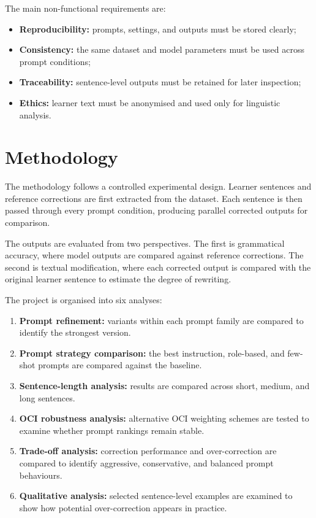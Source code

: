 The main non-functional requirements are:

\begin{itemize}
    \item \textbf{Reproducibility:} prompts, settings, and outputs must be stored clearly;
    \item \textbf{Consistency:} the same dataset and model parameters must be used across prompt conditions;
    \item \textbf{Traceability:} sentence-level outputs must be retained for later inspection;
    \item \textbf{Ethics:} learner text must be anonymised and used only for linguistic analysis.
\end{itemize}

\section{Methodology}

The methodology follows a controlled experimental design. Learner sentences and reference corrections are first extracted from the dataset. Each sentence is then passed through every prompt condition, producing parallel corrected outputs for comparison.

The outputs are evaluated from two perspectives. The first is grammatical accuracy, where model outputs are compared against reference corrections. The second is textual modification, where each corrected output is compared with the original learner sentence to estimate the degree of rewriting.

The project is organised into six analyses:

\begin{enumerate}
    \item \textbf{Prompt refinement:} variants within each prompt family are compared to identify the strongest version.
    \item \textbf{Prompt strategy comparison:} the best instruction, role-based, and few-shot prompts are compared against the baseline.
    \item \textbf{Sentence-length analysis:} results are compared across short, medium, and long sentences.
    \item \textbf{OCI robustness analysis:} alternative OCI weighting schemes are tested to examine whether prompt rankings remain stable.
    \item \textbf{Trade-off analysis:} correction performance and over-correction are compared to identify aggressive, conservative, and balanced prompt behaviours.
    \item \textbf{Qualitative analysis:} selected sentence-level examples are examined to show how potential over-correction appears in practice.
\end{enumerate}

